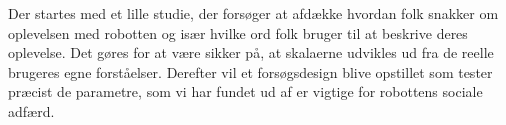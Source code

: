 Der startes med et lille studie, der forsøger at afdække hvordan folk snakker om oplevelsen med robotten og især hvilke ord folk bruger til at beskrive deres oplevelse. Det gøres for at være sikker på, at skalaerne udvikles ud fra de reelle brugeres egne forståelser. Derefter vil et forsøgsdesign blive opstillet som tester præcist de parametre, som vi har fundet ud af er vigtige for robottens sociale adfærd.
